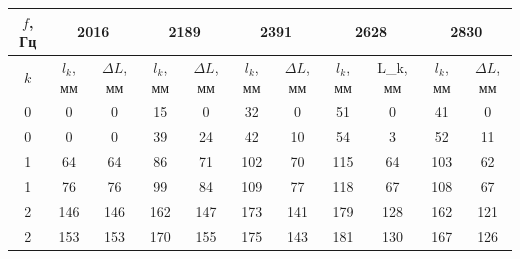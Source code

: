 \documentclass[a4paper, 12pt]{article}
\begin{document}
            \begin{table}[H]
                \centering
                \begin{tabular}{|c|cc|cc|cc|cc|cc|}
                    \hline
                    
                    $f$, Гц & \multicolumn{2}{c|}{2016} & \multicolumn{2}{c|}{2189} & \multicolumn{2}{c|}{2391} & \multicolumn{2}{c|}{2628} & \multicolumn{2}{c|}{2830} \\ \hline
                    
                    $k$ & \multicolumn{1}{c|}{$l_k$, мм} & $\Delta L$, мм & \multicolumn{1}{c|}{$l_k$, мм} & $\Delta L$, мм & \multicolumn{1}{c|}{$l_k$, мм} & $\Delta L$, мм & \multicolumn{1}{c|}{$l_k$, мм} & L\_k, мм & \multicolumn{1}{c|}{$l_k$, мм} & $\Delta L$, мм \\ \hline
                    
                    0 & \multicolumn{1}{c|}{0} & 0 & \multicolumn{1}{c|}{15}       & 0 & \multicolumn{1}{c|}{32} & 0 & \multicolumn{1}{c|}{51} & 0 & \multicolumn{1}{c|}{41} & 0 \\ \hline
                    
                    0 & \multicolumn{1}{c|}{0} & 0 & \multicolumn{1}{c|}{39}       & 24 & \multicolumn{1}{c|}{42} & 10 & \multicolumn{1}{c|}{54} & 3 & \multicolumn{1}{c|}{52} & 11 \\ \hline
                    
                    1 & \multicolumn{1}{c|}{64} & 64 & \multicolumn{1}{c|}{86} & 71 & \multicolumn{1}{c|}{102} & 70 & \multicolumn{1}{c|}{115} & 64 & \multicolumn{1}{c|}{103} & 62 \\ \hline
                    
                    1 & \multicolumn{1}{c|}{76} & 76 & \multicolumn{1}{c|}{99} & 84 & \multicolumn{1}{c|}{109} & 77 & \multicolumn{1}{c|}{118} & 67 & \multicolumn{1}{c|}{108} & 67 \\ \hline
                    
                    2 & \multicolumn{1}{c|}{146} & 146 & \multicolumn{1}{c|}{162} & 147 & \multicolumn{1}{c|}{173} & 141 & \multicolumn{1}{c|}{179} & 128 & \multicolumn{1}{c|}{162} & 121 \\ \hline
                    
                    2     & \multicolumn{1}{c|}{153} & 153 & \multicolumn{1}{c|}{170} & 155 & \multicolumn{1}{c|}{175} & 143 & \multicolumn{1}{c|}{181} & 130 & \multicolumn{1}{c|}{167} & 126 \\ \hline
                    

\end{tabular}
\end{table}
\end{document}
